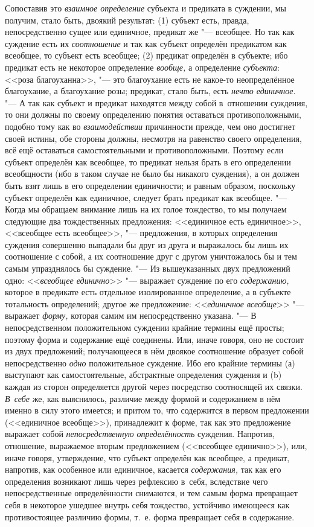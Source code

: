 Сопоставив это {\em взаимное определение} субъекта и предиката в суждении, мы
получим, стало быть, двоякий результат: (1) субъект есть, правда,
непосредственно сущее или единичное, предикат же "--- всеобщее. Но так как
суждение есть их {\em соотношение} и так как субъект определён предикатом как
всеобщее, то субъект есть всеобщее; (2) предикат определён в субъекте; ибо
предикат есть не некоторое определение {\em вообще,} а определение
{\em субъекта}: <<роза благоуханна>>, "--- это благоухание есть не какое-то
неопределённое благоухание, а благоухание розы; предикат, стало быть, есть
{\em нечто единичное}. "--- А так как субъект и предикат находятся между собой
в~отношении суждения, то они должны по своему определению понятия оставаться
противоположными, подобно тому как во {\em взаимодействии}
причинности прежде, чем оно достигнет своей истины, обе
стороны должны, несмотря на равенство своего определения, всё ещё
оставаться самостоятельными и противоположными. Поэтому если субъект
определён как всеобщее, то предикат нельзя брать в его определении
всеобщности (ибо в таком случае не было бы никакого
суждения), а он должен быть взят лишь в его определении
единичности; и равным образом, поскольку субъект определён как единичное,
следует брать предикат как всеобщее. "--- Когда мы обращаем
внимание лишь на их голое тождество, то мы получаем следующие два
тождественных предложения:\label{bkm:bm35a}
<<единичное есть единичное>>, <<всеобщее есть всеобщее>>, "--- предложения,
в которых определения суждения совершенно выпадали бы друг из друга и
выражалось бы лишь их соотношение с собой, а их соотношение друг с другом
уничтожалось бы и тем самым упразднялось бы суждение. "--- Из
вышеуказанных двух предложений одно: <<{\em всеобщее единично}>> "---
выражает суждение по его {\em содержанию,} которое
в предикате есть отдельное изолированное определение, а в субъекте
тотальность определений; другое же предложение:
<<{\em единичное всеобще}>> "--- выражает {\em форму,}
которая самим им непосредственно указана. "---
В непосредственном положительном суждении крайние термины
ещё просты; поэтому форма и содержание ещё соединены. Или, иначе говоря,
оно не состоит из двух предложений; получающееся в нём двоякое соотношение
образует собой непосредственно {\em одно} положительное
суждение. Ибо его крайние термины (а) выступают как самостоятельные,
абстрактные определения суждения и (b) каждая из сторон определяется другой
через посредство соотносящей их связки. {\em В~себе} же, как
выяснилось, различие между формой и содержанием в нём именно в силу этого
имеется; и притом то, что содержится в первом предложении (<<единичное
всеобще>>), принадлежит к форме, так как это предложение выражает собой
{\em непосредственную определённость} суждения. Напротив, отношение,
выражаемое вторым предложением (<<всеобщее единично>>), или, иначе говоря,
утверждение, что субъект определён как всеобщее, а предикат, напротив, как
особенное или единичное, касается {\em содержания,} так как его определения
возникают лишь через рефлексию в~себя, вследствие чего непосредственные
определённости снимаются, и тем самым форма превращает себя в некоторое ушедшее
внутрь себя тождество, устойчиво имеющееся как противостоящее различию формы,
т.~е. форма превращает себя в содержание.

